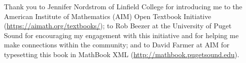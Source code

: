 \documentclass[openany, oneside]{book}
\begin{document}
\bigskip
\noindent
Thank you to Jennifer Nordstrom of Linfield College for introducing me to the American Institute of Mathematics (AIM) Open Textbook Initiative (\url{https://aimath.org/textbooks/}); to Rob Beezer at the University of Puget Sound for encouraging my engagement with this initiative and for helping me make connections within the community; and to David Farmer at AIM for typesetting this book in MathBook XML (\url{http://mathbook.pugetsound.edu}).

\vfill \vfill \vfill


\tableofcontents

\mainmatter












\backmatter
\appendix

\pagestyle{fancy}
\lhead{}
\chead{}
\rhead{\thepage}
\lfoot{}
\cfoot{}
\rfoot{}
\renewcommand{\headrulewidth}{0pt}

\thispagestyle{plain}
{}



\begin{comment}


\chapter{Proof that $S_0$ is trivial}

By definition, $S_0$ is the set of permutations of the empty set, that is, the set of all bijections from $\emptyset$ to $\emptyset$.  If we go back to the true definition of a function, we recall that a function from a set $A$ to itself is a relation $f$ on $A$ (that is, a subset of $A \times A$) such that for each $a\in A$, there is a unique $b\in A$ such that $(a,b)\in f$.

So let A be the empty set.  Then $A \times A$ is also the empty set (do you see why?). Now,  $f=\emptyset$ is a subset of $A \times A$, and it is vacuously true that $f$ has the property that for each $a\in A$, there is a unique $b\in A$ such that $(a,b)\in f$ (it is vacuously true since there are no elements of $A$).  So $f$ is a function from $A$ to $A$. Since there is no other subset of $A \times A$, $f$ is the only function from $A$ to $A$.

The remaining question is: Is  $f$ a permutation on $A$; that is, is $f$ a bijection?  The answer is yes: $f$ is both vacuously onto and vacuously one-to-one.  So there is a unique bijection from $\emptyset$ to $\emptyset$. Formally, it's the subset $\emptyset$ of $\emptyset \times \emptyset$.  Informally, it's the unique map that doesn't send anything anywhere.

Thus, $S_0$ contains exactly one element, and hence is the trivial group.
\end{comment}
{}
\end{document}
